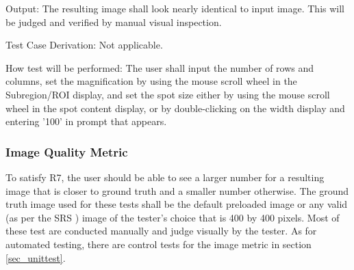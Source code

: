 \documentclass[12pt, titlepage]{article}
\begin{document}
\begin{enumerate}
    Output: The resulting image shall look nearly identical to input image.
      This will be judged and verified by manual visual inspection.

    Test Case Derivation: Not applicable.

    How test will be performed: The user shall input the number of rows and columns,
      set the magnification by using the mouse scroll wheel in the Subregion/ROI display,
      and set the spot size either by using the mouse scroll wheel in
      the spot content display, or by double-clicking on the width display and entering '100'
      in prompt that appears.

\end{enumerate}


\subsubsection{Image Quality Metric} \label{subsec_img_metric}

To satisfy R7, the user should be able to see a larger number for a resulting image that is closer to ground truth 
and a smaller number otherwise. The ground truth image used for these tests shall be the default
preloaded image or any valid (as per the SRS \cite{SRS}) image of the tester's choice that is
400 by 400 pixels. Most of these test are conducted manually and judge visually by the tester.
As for automated testing, there are control tests for the image metric in section \ref{sec_unittest}.
\end{document}
